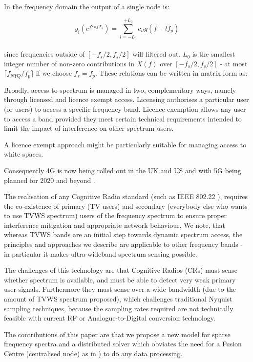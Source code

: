 In the frequency domain the output of a single node is:

\begin{equation}
y_i\left(e^{j 2 \pi f T_s }\right) = \sum_{l = -L_0}^{+L_0} c_{il} g\left(f-lf_p\right)
\end{equation}
\\
since frequencies outside of \([-f_s/2, f_s/2]\) will filtered out. \(L_0\) is the smallest integer number of non-zero contributions in \(X\left(f\right)\) over \([-f_s/2, f_s/2]\) - at most \(\lceil f_{NYQ}/f_p\rceil\) if we choose \(f_s = f_p\). These relations can be written in matrix form as:

Broadly, access to spectrum is managed in two, complementary ways, namely through licensed and licence exempt access. Licensing authorises a particular user (or users) to access a specific frequency band. Licence exemption allows any user to access a band provided they meet certain technical requirements intended to limit the impact of interference on other spectrum users.

A licence exempt approach might be particularly suitable for managing access to white spaces. 

Consequently 4G is now being rolled out in the UK and US and with 5G being planned for 2020 and beyond \cite{Dahlman2014}.  


The realisation of any Cognitive Radio standard (such as IEEE 802.22 \cite{stevenson2009ieee}), requires the co-existence of primary (TV users) and secondary (everybody else who wants to use TVWS spectrum) users of the frequency spectrum to ensure proper interference mitigation and appropriate network behaviour. We note, that whereas TVWS bands are an initial step towards dynamic spectrum access, the principles and approaches we describe are applicable to other frequency bands - in particular it makes ultra-wideband spectrum sensing possible.

The challenges of this technology are that Cognitive Radios (CRs) must sense whether spectrum is available, and must be able to detect very weak primary user signals. Furthermore they must sense over a wide bandwidth (due to the amount of TVWS spectrum proposed), which challenges traditional Nyquist sampling techniques, because the sampling rates required are not technically feasible with current RF or Analogue-to-Digital conversion technology.

The contributions of this paper are that we propose a new model for sparse frequency spectra and a distributed solver which obviates the need for a Fusion Centre (centralised node) as in \cite{Zhang2011b}) to do any data processing. 

